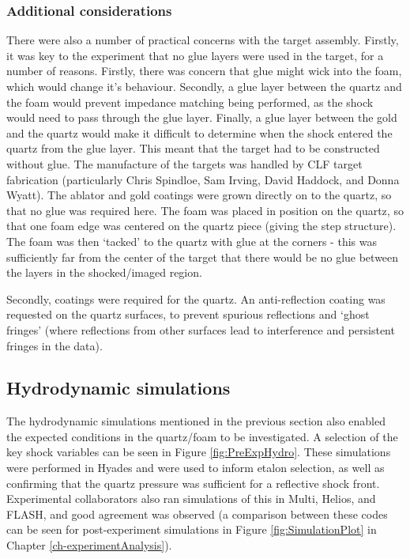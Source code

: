 \subsubsection{Additional considerations}

There were also a number of practical concerns with the target assembly. Firstly, it was key to the experiment that no glue layers were used in the target, for a number of reasons. Firstly, there was concern that glue might wick into the foam, which would change it's behaviour. Secondly, a glue layer between the quartz and the foam would prevent impedance matching being performed, as the shock would need to pass through the glue layer. Finally, a glue layer between the gold and the quartz would make it difficult to determine when the shock entered the quartz from the glue layer. This meant that the target had to be constructed without glue. The manufacture of the targets was handled by CLF target fabrication (particularly Chris Spindloe, Sam Irving, David Haddock, and Donna Wyatt). The ablator and gold coatings were grown directly on to the quartz, so that no glue was required here. The foam was placed in position on the quartz, so that one foam edge was centered on the quartz piece (giving the step structure). The foam was then `tacked' to the quartz with glue at the corners - this was sufficiently far from the center of the target that there would be no glue between the layers in the shocked/imaged region.

Secondly, coatings were required for the quartz. An anti-reflection coating was requested on the quartz surfaces, to prevent spurious reflections and `ghost fringes' (where reflections from other surfaces lead to interference and persistent fringes in the data).

\subsection{Hydrodynamic simulations}

The hydrodynamic simulations mentioned in the previous section also enabled the expected conditions in the quartz/foam to be investigated. A selection of the key shock variables can be seen in Figure \ref{fig:PreExpHydro}. These simulations were performed in Hyades and were used to inform etalon selection, as well as confirming that the quartz pressure was sufficient for a reflective shock front. Experimental collaborators also ran simulations of this in Multi, Helios, and FLASH, and good agreement was observed (a comparison between these codes can be seen for post-experiment simulations in Figure \ref{fig:SimulationPlot} in Chapter \ref{ch-experimentAnalysis}).

